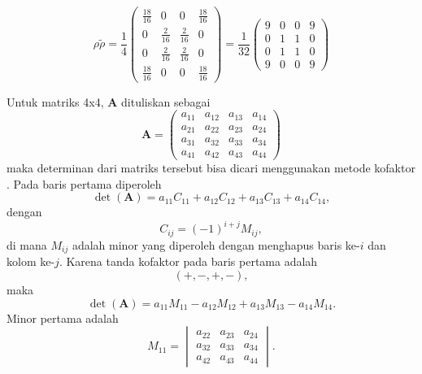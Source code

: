 \begin{equation}
	\rho \tilde{\rho}=\frac{1}{4}
	\begin{pmatrix}
		\frac{18}{16}&0&0&\frac{18}{16}\\
		0&\frac{2}{16}&\frac{2}{16}&0\\
		0&\frac{2}{16}&\frac{2}{16}&0\\
		\frac{18}{16}&0&0&\frac{18}{16}
	\end{pmatrix}
	=\frac{1}{32}
	\begin{pmatrix}
		9&0&0&9\\
		0&1&1&0\\
		0&1&1&0\\
		9&0&0&9
	\end{pmatrix}
\end{equation}
\par
Untuk matriks 4x4, $\mathbf{A}$ dituliskan sebagai
\begin{equation}
	\mathbf{A}=
	\begin{pmatrix}
		a_{11}&a_{12}&a_{13}&a_{14}\\
		a_{21}&a_{22}&a_{23}&a_{24}\\
		a_{31}&a_{32}&a_{33}&a_{34}\\
		a_{41}&a_{42}&a_{43}&a_{44}
	\end{pmatrix}
\end{equation}
maka determinan dari matriks tersebut bisa dicari menggunakan metode kofaktor \cite{lay2016linear}. Pada baris pertama diperoleh
\begin{equation}
	\det(\mathbf{A})
	=
	a_{11}C_{11}
	+a_{12}C_{12}
	+a_{13}C_{13}
	+a_{14}C_{14},
\end{equation}
dengan
\begin{equation}
	C_{ij}=(-1)^{i+j}M_{ij},
\end{equation}
di mana $M_{ij}$ adalah minor yang diperoleh dengan menghapus baris ke-$i$
dan kolom ke-$j$.
Karena tanda kofaktor pada baris pertama adalah
\[
(+,-,+,-),
\]
maka
\begin{equation}
	\boxed{
		\det(\mathbf{A})
		=
		a_{11}M_{11}
		-
		a_{12}M_{12}
		+
		a_{13}M_{13}
		-
		a_{14}M_{14}.
	}
\end{equation}
Minor pertama adalah
\begin{equation}
	M_{11}
	=
	\begin{vmatrix}
		a_{22}&a_{23}&a_{24}\\
		a_{32}&a_{33}&a_{34}\\
		a_{42}&a_{43}&a_{44}
	\end{vmatrix}.
\end{equation}

